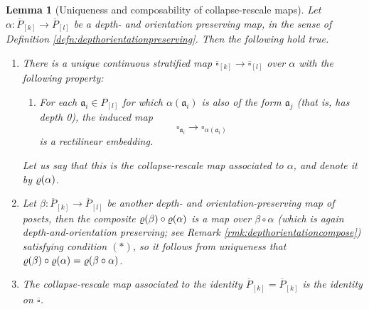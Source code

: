 \documentclass[10pt, reqno, twoside
, final
]{amsart}
\numberwithin{equation}{subsection}%
\theoremstyle{definition}
\theoremstyle{definition}
\theoremstyle{definition}
\theoremstyle{definition}
\theoremstyle{definition}
\theoremstyle{definition}
\theoremstyle{definition}
\theoremstyle{definition}
\theoremstyle{definition}
\theoremstyle{plain}
\theoremstyle{definition}
\theoremstyle{plain}
\theoremstyle{definition}
\theoremstyle{plain}
\theoremstyle{definition}
\theoremstyle{definition}
\theoremstyle{plain}
\newtheorem{lem}[defn]{Lemma}
\theoremstyle{plain}
\theoremstyle{definition}
\theoremstyle{plain}
\theoremstyle{plain}
\theoremstyle{plain}
\begin{document}
\begin{lem}[Uniqueness and composability of collapse-rescale maps]\label{lem:collaplsrescale}
Let $\alpha:\overline{P}_{[k]}\rightarrow \overline{P}_{[l]}$ be a depth- and orientation preserving map, in the sense of Definition \ref{defn:depthorientationpreserving}. Then the following hold true.
\begin{enumerate}[$(1)$]
    \item There is a unique continuous stratified map $\overline{\square}_{[k]}\rightarrow \overline{\square}_{[l]}$ over $\alpha$ with the following property: 
    \begin{enumerate}
        \item[$(*)$] For each $\mathfrak{a}_i\in P_{[l]}$ for which $\alpha(\mathfrak{a}_i)$ is also of the form $\mathfrak{a}_j$ (that is, has depth 0), the induced map 
    \[  \square_{\mathfrak{a}_i}\longrightarrow \square_{\alpha(\mathfrak{a}_i)} \]
    is a rectilinear embedding.
    \end{enumerate} 
    Let us say that this is the \emph{collapse-rescale map associated to $\alpha$}, and denote it by $\varrho(\alpha)$.
    \item Let $\beta:\overline{P}_{[k]}\rightarrow \overline{P}_{[l]}$ be another depth- and orientation-preserving map of posets, then the composite $ \varrho(\beta)\circ \varrho(\alpha)$ is a map over $\beta\circ \alpha$ (which is again depth-and-orientation preserving; see Remark \ref{rmk:depthorientationcompose}) satisfying condition $(*)$, so it follows from uniqueness that $ \varrho(\beta)\circ \varrho(\alpha)=\varrho(\beta\circ \alpha)$.
    \item The collapse-rescale map associated to the identity $\overline{P}_{[k]}=\overline{P}_{[k]}$ is the identity on $\overline{\square}$.
\end{enumerate}
\end{lem}
\end{document}
